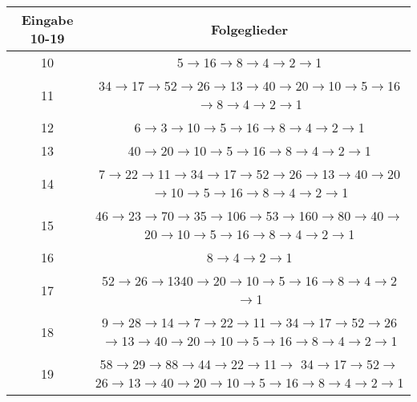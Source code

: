 \documentclass[paper=a4, fontsize=11pt]{scrartcl}
\numberwithin{equation}{section}
\numberwithin{figure}{section}
\numberwithin{table}{section}
\begin{document}
 \begin{tabular}{|c|c|}
  \hline
   Eingabe 10-19 & Folgeglieder \\ 
   \hline
   10 & 5$\rightarrow$16$\rightarrow$8$\rightarrow$4$\rightarrow$2$\rightarrow$1 \\ 
   \hline
   11 & 34$\rightarrow$17$\rightarrow$52$\rightarrow$26$\rightarrow$13$\rightarrow$40$\rightarrow$20$\rightarrow$10$\rightarrow$5$\rightarrow$16$\rightarrow$8$\rightarrow$4$\rightarrow$2$\rightarrow$1\\ 
   \hline
   12 & 6$\rightarrow$3$\rightarrow$10$\rightarrow$5$\rightarrow$16$\rightarrow$8$\rightarrow$4$\rightarrow$2$\rightarrow$1\\ 
   \hline
   13 & 40$\rightarrow$20$\rightarrow$10$\rightarrow$5$\rightarrow$16$\rightarrow$8$\rightarrow$4$\rightarrow$2$\rightarrow$1\\ 
   \hline
   14 & 7$\rightarrow$22$\rightarrow$11$\rightarrow$34$\rightarrow$17$\rightarrow$52$\rightarrow$26$\rightarrow$13$\rightarrow$40$\rightarrow$20$\rightarrow$10$\rightarrow$5$\rightarrow$16$\rightarrow$8$\rightarrow$4$\rightarrow$2$\rightarrow$1\\ 
   \hline
   15 & 46$\rightarrow$23$\rightarrow$70$\rightarrow$35$\rightarrow$106$\rightarrow$53$\rightarrow$160$\rightarrow$80$\rightarrow$40$\rightarrow$20$\rightarrow$10$\rightarrow$5$\rightarrow$16$\rightarrow$8$\rightarrow$4$\rightarrow$2$\rightarrow$1\\ 
   \hline
   16 & 8$\rightarrow$4$\rightarrow$2$\rightarrow$1\\ 
   \hline
   17 & 52$\rightarrow$26$\rightarrow$1340$\rightarrow$20$\rightarrow$10$\rightarrow$5$\rightarrow$16$\rightarrow$8$\rightarrow$4$\rightarrow$2$\rightarrow$1\\ 
   \hline
   18 & 9$\rightarrow$28$\rightarrow$14$\rightarrow$7$\rightarrow$22$\rightarrow$11$\rightarrow$34$\rightarrow$17$\rightarrow$52$\rightarrow$26$\rightarrow$13$\rightarrow$40$\rightarrow$20$\rightarrow$10$\rightarrow$5$\rightarrow$16$\rightarrow$8$\rightarrow$4$\rightarrow$2$\rightarrow$1\\ 
   \hline
   19 & 58$\rightarrow$29$\rightarrow$88$\rightarrow$44$\rightarrow$22$\rightarrow$11$\rightarrow$ 34$\rightarrow$17$\rightarrow$52$\rightarrow$26$\rightarrow$13$\rightarrow$40$\rightarrow$20$\rightarrow$10$\rightarrow$5$\rightarrow$16$\rightarrow$8$\rightarrow$4$\rightarrow$2$\rightarrow$1\\ 
   \hline 
\end{tabular}
\\
 
\end{document}
